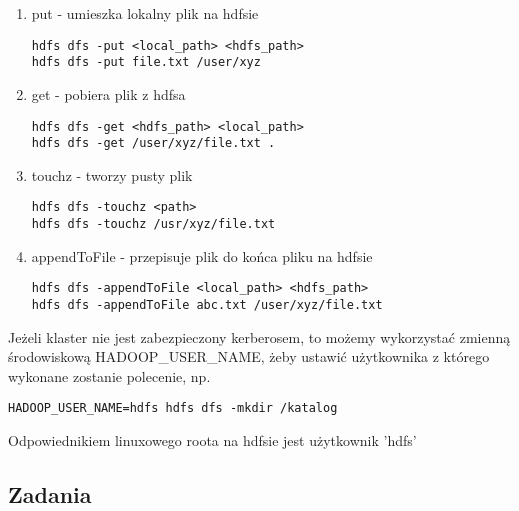 \documentclass[11pt]{article}
\begin{document}
\begin{enumerate}
\item put - umieszka lokalny plik na hdfsie
\begin{lstlisting}
hdfs dfs -put <local_path> <hdfs_path>
hdfs dfs -put file.txt /user/xyz
\end{lstlisting}

\item get - pobiera plik z hdfsa
\begin{lstlisting}
hdfs dfs -get <hdfs_path> <local_path>
hdfs dfs -get /user/xyz/file.txt .
\end{lstlisting}

\item touchz - tworzy pusty plik
\begin{lstlisting}
hdfs dfs -touchz <path>
hdfs dfs -touchz /usr/xyz/file.txt
\end{lstlisting}

\item appendToFile - przepisuje plik do końca pliku na hdfsie
\begin{lstlisting}
hdfs dfs -appendToFile <local_path> <hdfs_path>
hdfs dfs -appendToFile abc.txt /user/xyz/file.txt
\end{lstlisting}

\end{enumerate}

Jeżeli klaster nie jest zabezpieczony kerberosem, to możemy wykorzystać zmienną środowiskową HADOOP\_USER\_NAME, żeby ustawić użytkownika z którego wykonane zostanie polecenie, np.
\begin{lstlisting}
HADOOP_USER_NAME=hdfs hdfs dfs -mkdir /katalog
\end{lstlisting}
Odpowiednikiem linuxowego roota na hdfsie jest użytkownik 'hdfs'

\pagebreak

\subsection*{Zadania}
\end{document}
